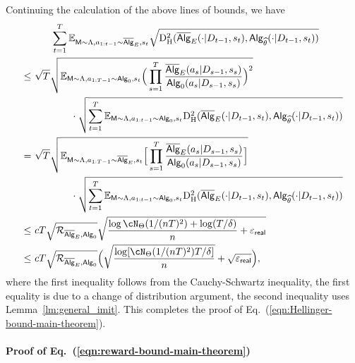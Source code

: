 Continuing the calculation of the above lines of bounds, we have
\begin{align*}
&\qquad
\sum_{t=1}^\totlen\E_{\inst\sim\prior,\action_{1:t-1}\sim\osAlg_\shortexp,\state_t}\sqrt{\HelDs(\osAlg_{\shortexp}(\cdot|\dset_{t-1},\state_t),\sAlg_{\EstPar}(\cdot|\dset_{t-1},\state_t))}\\
\leq&~
\sqrt{\totlen}\sqrt{\E_{\inst\sim\prior,\action_{1:\totlen-1}\sim\sAlg_0,\state_t}
\Big(\prod_{s=1}^{\totlen}\frac{\osAlg_\shortexp(\action_s|\dset_{s-1},\state_s)}{\sAlg_0(\action_s|\dset_{s-1},\state_s)}\Big)^2}
\\
&\qquad\qquad\cdot\sqrt{\sum_{t=1}^\totlen{\E_{\inst\sim\prior,\action_{1:t-1}\sim\sAlg_0,\state_t}\HelDs(\osAlg_{\shortexp}(\cdot|\dset_{t-1},\state_t),\sAlg_{\EstPar}(\cdot|\dset_{t-1},\state_t))}}\\
=&~
\sqrt{\totlen}\sqrt{\E_{\inst\sim\prior,\action_{1:\totlen-1}\sim\osAlg_\shortexp,\state_t}
\Big[\prod_{s=1}^{\totlen}\frac{\osAlg_\shortexp(\action_s|\dset_{s-1},\state_s)}{\sAlg_0(\action_s|\dset_{s-1},\state_s)}\Big]}
\\
&\qquad\qquad\cdot\sqrt{\sum_{t=1}^\totlen{\E_{\inst\sim\prior,\action_{1:t-1}\sim\sAlg_0,\state_t}\HelDs(\osAlg_{\shortexp}(\cdot|\dset_{t-1},\state_t),\sAlg_{\EstPar}(\cdot|\dset_{t-1},\state_t))}}
\\
\leq&~
c{\totlen}\sqrt{\distratio_{\osAlg_\shortexp,\sAlg_0}}
\sqrt{\frac{\log \cN_{\Parspace}(1/(\Numobs\totlen)^2)+\log(\totlen/\delta)}{n}+\geneps}\\
\leq&~ c
{\totlen}\sqrt{\distratio_{\osAlg_\shortexp,\sAlg_0}}
\Big(\sqrt{\frac{\log [\cN_{\Parspace}(1/(\Numobs\totlen)^2)\totlen/\delta]}{n}}+\sqrt{\geneps}\Big),
\end{align*} 
where the first inequality follows from the Cauchy-Schwartz inequality, the first equality is due to a change of distribution argument, the second inequality uses Lemma~\ref{lm:general_imit}. This completes the proof of Eq.~(\ref{eqn:Hellinger-bound-main-theorem}). 







\paragraph{Proof of Eq.~(\ref{eqn:reward-bound-main-theorem})}

